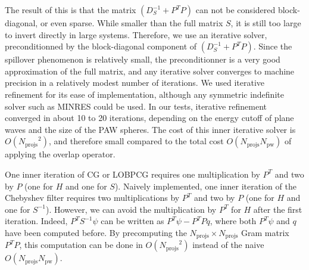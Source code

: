 \documentclass[11pt]{elsarticle}
\newcommand{\npw}{\ensuremath{N_{\text{pw}}}\xspace}
\newcommand{\nprojs}{\ensuremath{N_{\text{projs}}}\xspace}
\begin{document}
The result of this is that the matrix $(D_{S}^{-1} + P^{T} P)$ can not
be considered block-diagonal, or even sparse. While smaller than the
full matrix $S$, it is still too large to invert directly in large
systems. Therefore, we use an iterative solver, preconditionned by the
block-diagonal component of $(D_{S}^{-1} + P^{T} P)$. Since the
spillover phenomenon is relatively small, the preconditionner is a
very good approximation of the full matrix, and any iterative solver
converges to machine precision in a relatively modest number of
iterations. We used iterative refinement for its ease of
implementation, although any symmetric indefinite solver such as
MINRES could be used. In our tests, iterative refinement converged in
about 10 to 20 iterations, depending on the energy cutoff of plane
waves and the size of the PAW spheres. The cost of this inner
iterative solver is $O(\nprojs^{2})$, and therefore small compared to
the total cost $O(\nprojs \npw)$ of applying the overlap operator.



One inner iteration of CG or LOBPCG requires one multiplication by
$P^{T}$ and two by $P$ (one for $H$ and one for $S$). Naively
implemented, one inner iteration of the Chebyshev filter requires two
multiplications by $P^{T}$ and two by $P$ (one for $H$ and one for
$S^{-1}$). However, we can avoid the multiplication by $P^{T}$ for $H$
after the first iteration. Indeed, $P^{T} S^{-1} \psi$ can be written
as $P^{T} \psi - P^{T} P q$, where both $P^{T} \psi$ and $q$ have been
computed before. By precomputing the $\nprojs \times \nprojs$ Gram
matrix $P^{T} P$, this computation can be done in $O(\nprojs^{2})$
instead of the naive $O(\nprojs \npw)$.
\end{document}
